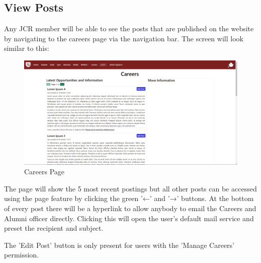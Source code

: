 \documentclass{article}
\begin{document}
\subsection{View Posts}
Any JCR member will be able to see the posts that are published on the website by navigating to the careers page via the navigation bar. The screen will look similar to this:
\begin{figure}[H]
    \centering
    \includegraphics[width=\textwidth,height=\textheight,keepaspectratio]{careers/careers_view.png}
    \caption{Careers Page}
    \label{fig:careers_view}
\end{figure}
The page will show the 5 most recent postings but all other posts can be accessed using the page feature by clicking the green '←' and '→' buttons. At the bottom of every post there will be a hyperlink to allow anybody to email the Careers and Alumni officer directly. Clicking this will open the user's default mail service and preset the recipient and subject. 

The 'Edit Post' button is only present for users with the 'Manage Careers' permission. 
\end{document}
